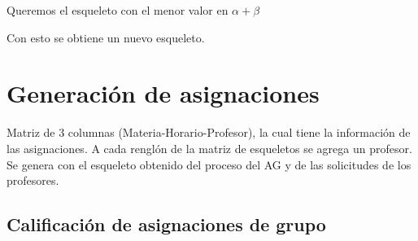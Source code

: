 Queremos el esqueleto con el menor valor en $\alpha + \beta$

Con esto se obtiene un nuevo esqueleto.


\section{Generación de asignaciones}

Matriz de 3 columnas (Materia-Horario-Profesor), la cual tiene la información de las asignaciones. A cada renglón de la matriz de esqueletos se agrega un profesor. Se genera con el esqueleto obtenido del proceso del AG y de las solicitudes de los profesores.

\subsection{Calificación de asignaciones de grupo}


%
%
%
%





